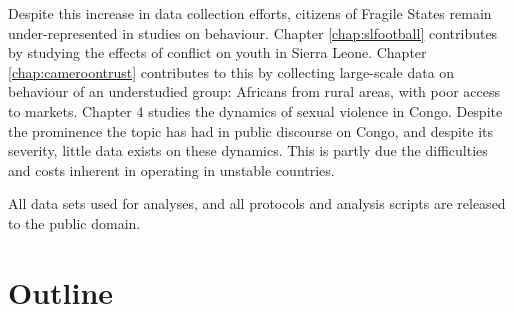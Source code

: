 Despite this increase in data collection efforts, citizens of Fragile States remain under-represented in studies on behaviour. Chapter \ref{chap:slfootball} contributes by studying the effects of conflict on youth in Sierra Leone. Chapter \ref{chap:cameroontrust} contributes to this by collecting large-scale data on behaviour of an understudied group: Africans from rural areas, with poor access to markets. Chapter 4 studies the dynamics of sexual violence in Congo. Despite the prominence the topic has had in public discourse on Congo, and despite its severity, little data exists on these dynamics. This is partly due the difficulties and costs inherent in operating in unstable countries.

All data sets used for analyses, and all protocols and analysis scripts are released to the public domain.


\section{Outline}


\clearpage 

